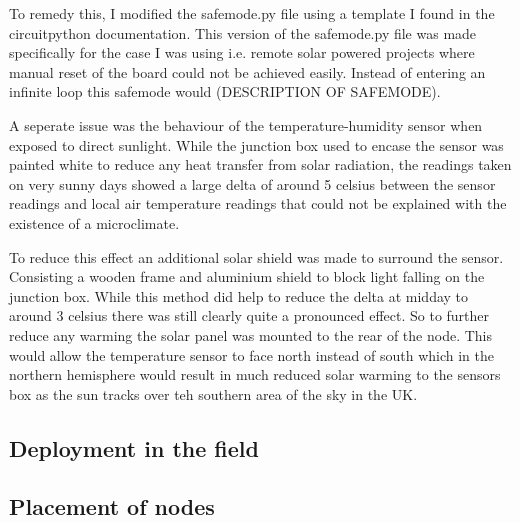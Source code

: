 To remedy this, I modified the safemode.py file using a template I found in the
circuitpython documentation. This version of the safemode.py file was made
specifically for the case I was using i.e. remote solar powered projects where
manual reset of the board could not be achieved easily. Instead of entering an
infinite loop this safemode would (DESCRIPTION OF SAFEMODE).

A seperate issue was the behaviour of the temperature-humidity sensor when
exposed to direct sunlight. While the junction box used to encase the sensor was
painted white to reduce any heat transfer from solar radiation, the readings
taken on very sunny days showed a large delta of around 5 celsius between the
sensor readings and local air temperature readings that could not be explained
with the existence of a microclimate.

To reduce this effect an additional solar shield was made to surround the
sensor. Consisting a wooden frame and aluminium shield to block light falling on
the junction box. While this method did help to reduce the delta at midday to
around 3 celsius there was still clearly quite a pronounced effect. So to
further reduce any warming the solar panel was mounted to the rear of the node.
This would allow the temperature sensor to face north instead of south which in
the northern hemisphere would result in much reduced solar warming to the
sensors box as the sun tracks over teh southern area of the sky in the UK.

\subsection{Deployment in the field}

\subsection{Placement of nodes}